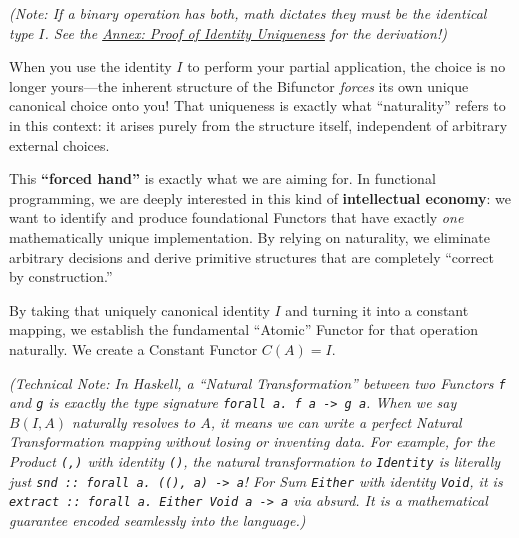 \documentclass[
]{article}
\begin{document}
\emph{(Note: If a binary operation has both, math dictates they must be
the identical type \(I\). See the
\hyperref[proof-of-identity-uniqueness]{Annex: Proof of Identity
Uniqueness} for the derivation!)}

When you use the identity \(I\) to perform your partial application, the
choice is no longer yours---the inherent structure of the Bifunctor
\emph{forces} its own unique canonical choice onto you! That uniqueness
is exactly what ``naturality'' refers to in this context: it arises
purely from the structure itself, independent of arbitrary external
choices.

This \textbf{``forced hand''} is exactly what we are aiming for. In
functional programming, we are deeply interested in this kind of
\textbf{intellectual economy}: we want to identify and produce
foundational Functors that have exactly \emph{one} mathematically unique
implementation. By relying on naturality, we eliminate arbitrary
decisions and derive primitive structures that are completely ``correct
by construction.''

By taking that uniquely canonical identity \(I\) and turning it into a
constant mapping, we establish the fundamental ``Atomic'' Functor for
that operation naturally. We create a Constant Functor \(C(A) = I\).

\emph{(Technical Note: In Haskell, a ``Natural Transformation'' between
two Functors \texttt{f} and \texttt{g} is exactly the type signature
\texttt{forall\ a.\ f\ a\ -\textgreater{}\ g\ a}. When we say
\(B(I, A)\) naturally resolves to \(A\), it means we can write a perfect
Natural Transformation mapping without losing or inventing data. For
example, for the Product \texttt{(,)} with identity \texttt{()}, the
natural transformation to \texttt{Identity} is literally just
\texttt{snd\ ::\ forall\ a.\ ((),\ a)\ -\textgreater{}\ a}! For Sum
\texttt{Either} with identity \texttt{Void}, it is
\texttt{extract\ ::\ forall\ a.\ Either\ Void\ a\ -\textgreater{}\ a}
via absurd. It is a mathematical guarantee encoded seamlessly into the
language.)}
\end{document}
